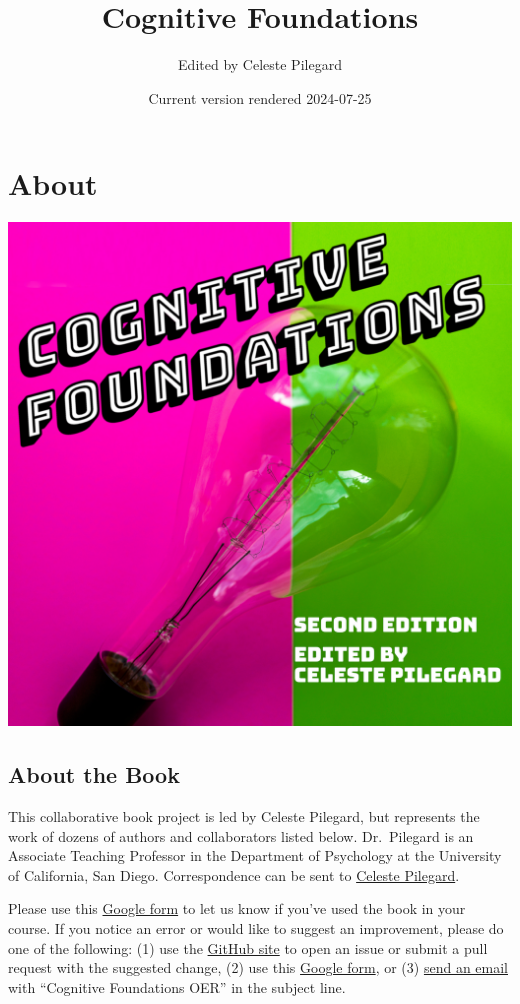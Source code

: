 \documentclass[
]{krantz}
\title{Cognitive Foundations}
\author{Edited by Celeste Pilegard}
\date{Current version rendered 2024-07-25}
\begin{document}
\maketitle

{
\setcounter{tocdepth}{1}
\tableofcontents
}
\chapter*{About}\label{about}


\includegraphics{images/cover.png}

\section*{About the Book}\label{about-the-book}


This collaborative book project is led by Celeste Pilegard, but represents the work of dozens of authors and collaborators listed below. Dr.~Pilegard is an Associate Teaching Professor in the Department of Psychology at the University of California, San Diego. Correspondence can be sent to \href{mailto:pilegard@ucsd.edu}{Celeste Pilegard}.

Please use this \href{https://forms.gle/83CBvAgLuJshRfz37}{Google form} to let us know if you've used the book in your course. If you notice an error or would like to suggest an improvement, please do one of the following: (1) use the \href{https://github.com/pilegard/cogfoundations}{GitHub site} to open an issue or submit a pull request with the suggested change, (2) use this \href{https://forms.gle/83CBvAgLuJshRfz37}{Google form}, or (3) \href{mailto:pilegard@ucsd.edu}{send an email} with ``Cognitive Foundations OER'' in the subject line.
\end{document}
